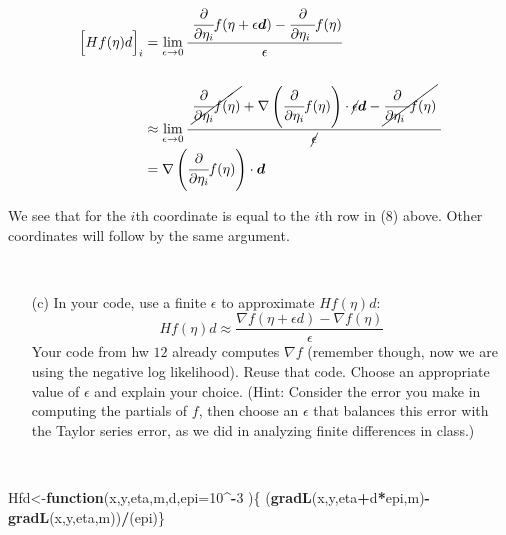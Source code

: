 \documentclass[]{article}
\newenvironment{Shaded}{\begin{snugshade}}{\end{snugshade}}
\newcommand{\KeywordTok}[1]{\textcolor[rgb]{0.13,0.29,0.53}{\textbf{#1}}}
\newcommand{\DataTypeTok}[1]{\textcolor[rgb]{0.13,0.29,0.53}{#1}}
\newcommand{\DecValTok}[1]{\textcolor[rgb]{0.00,0.00,0.81}{#1}}
\newcommand{\ControlFlowTok}[1]{\textcolor[rgb]{0.13,0.29,0.53}{\textbf{#1}}}
\newcommand{\OperatorTok}[1]{\textcolor[rgb]{0.81,0.36,0.00}{\textbf{#1}}}
\newcommand{\NormalTok}[1]{#1}
\begin{document}
\begin{itemize}
  \begin{align*}
     \Big[Hf(\eta)d\Big]_i &= \lim_{\epsilon \rightarrow 0} \cfrac{ \ \cfrac{\partial }{\partial \eta_i }  f(\eta + \epsilon {\bm d}) -   \cfrac{\partial }{\partial \eta_i \ }   f(\eta)}{\epsilon}   \\
     \\
   & \approx \lim_{\epsilon \rightarrow 0} \cfrac{ \ \cancel{ \cfrac{ \partial }{\partial \eta_i }  f(\eta) } + \nabla 
     \left( \cfrac{\partial }{\partial \eta_i }  f(\eta) \right) \cdot \cancel{ \epsilon} {\bm d} - \cancel{ \cfrac{\partial }{\partial \eta_i \ }   f(\eta)} \ }{ \cancel{\epsilon }}   \\
     &= \nabla   \left( \cfrac{\partial }{\partial \eta_i }  f(\eta) \right) \cdot {\bm d}
\end{align*}

We see that for the $i$th coordinate is equal to the $i$th row in (8) above. Other coordinates will follow by the same argument.
\end{itemize}

~

\begin{itemize} \item[(c)]
In your code, use a finite $\epsilon$ to approximate $Hf(\eta)d$:
\begin{equation}
Hf(\eta)d \approx \frac{\nabla f(\eta + \epsilon d) - \nabla f(\eta)}{\epsilon}
\end{equation}
Your code from hw $12$ already computes $\nabla f$ (remember though, now we are using the negative log likelihood).  Reuse that code.  Choose an appropriate value of $\epsilon$ and explain your choice.  (Hint:  Consider the error you make in computing the partials of $f$, then choose an $\epsilon$ that balances this error with the Taylor series error, as we did in analyzing finite differences in class.)   
\end{itemize}

~

\begin{Shaded}
\begin{Highlighting}[]
\NormalTok{Hfd<-}\ControlFlowTok{function}\NormalTok{(x,y,eta,m,d,}\DataTypeTok{epi=}\DecValTok{10}\OperatorTok{^-}\DecValTok{3}\NormalTok{ )\{  (}\KeywordTok{gradL}\NormalTok{(x,y,eta}\OperatorTok{+}\NormalTok{d}\OperatorTok{*}\NormalTok{epi,m)}\OperatorTok{-}\KeywordTok{gradL}\NormalTok{(x,y,eta,m))}\OperatorTok{/}\NormalTok{(epi)\}}
\end{Highlighting}
\end{Shaded}
\end{document}
